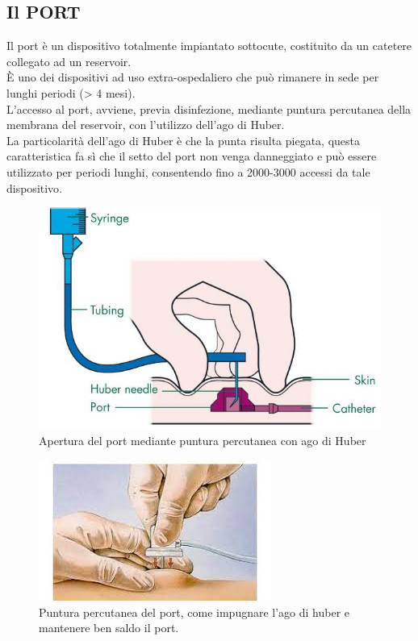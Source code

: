 \subsection{Il PORT}

Il port è un dispositivo totalmente impiantato sottocute, costituito da un catetere collegato ad un reservoir\cite{AIOMCVC}.\\
È uno dei dispositivi ad uso extra-ospedaliero che può rimanere in sede per lunghi periodi (> 4 mesi)\cite{GAVECELTracc2021}.\\
L’accesso al port, avviene, previa disinfezione, mediante puntura percutanea della membrana del reservoir, con 
l’utilizzo dell’ago di Huber\cite{AIOMCVC}.\\
La particolarità dell’ago di Huber è che la punta risulta piegata, questa caratteristica fa sì che il 
setto del port non venga danneggiato e può essere utilizzato per periodi lunghi,
consentendo fino a 2000-3000 accessi da tale dispositivo\cite{AIOMCVC}.\\

\begin{figure}[H]
    \begin{center}
    \includegraphics[width=0.5\columnwidth]{img/port-a-cath-picc.jpeg}
    \end{center}
    \caption[Apertura del port mediante puntura percutanea con ago di Huber]{Apertura del port mediante puntura percutanea con ago di Huber
    \cite{img43}}

\end{figure}

\begin{figure}[H]
    \begin{center}
    \includegraphics[width=0.5\columnwidth]{img/port2.jpeg}
    \end{center}
    \caption[Puntura percutanea del port, come impugnare l’ago di huber e mantenere ben saldo il port.]{Puntura percutanea del port, come impugnare l’ago di huber e mantenere ben saldo il port.
    \cite{img44}}

\end{figure}

